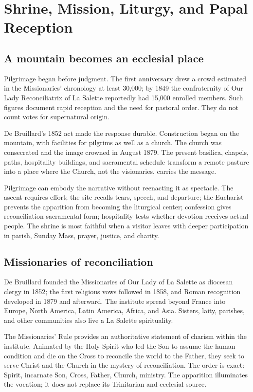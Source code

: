 \section{Shrine, Mission, Liturgy, and Papal Reception}

\subsection{A mountain becomes an ecclesial place}

Pilgrimage began before judgment. The first anniversary drew a crowd estimated in the Missionaries' chronology at least 30,000; by 1849 the confraternity of Our Lady Reconciliatrix of La Salette reportedly had 15,000 enrolled members. Such figures document rapid reception and the need for pastoral order. They do not count votes for supernatural origin.

De Bruillard's 1852 act made the response durable. Construction began on the mountain, with facilities for pilgrims as well as a church. The church was consecrated and the image crowned in August 1879. The present basilica, chapels, paths, hospitality buildings, and sacramental schedule transform a remote pasture into a place where the Church, not the visionaries, carries the message.

Pilgrimage can embody the narrative without reenacting it as spectacle. The ascent requires effort; the site recalls tears, speech, and departure; the Eucharist prevents the apparition from becoming the liturgical center; confession gives reconciliation sacramental form; hospitality tests whether devotion receives actual people. The shrine is most faithful when a visitor leaves with deeper participation in parish, Sunday Mass, prayer, justice, and charity.

\subsection{Missionaries of reconciliation}

De Bruillard founded the Missionaries of Our Lady of La Salette as diocesan clergy in 1852; the first religious vows followed in 1858, and Roman recognition developed in 1879 and afterward. The institute spread beyond France into Europe, North America, Latin America, Africa, and Asia. Sisters, laity, parishes, and other communities also live a La Salette spirituality.

The Missionaries' Rule provides an authoritative statement of charism within the institute. Animated by the Holy Spirit who led the Son to assume the human condition and die on the Cross to reconcile the world to the Father, they seek to serve Christ and the Church in the mystery of reconciliation. The order is exact: Spirit, incarnate Son, Cross, Father, Church, ministry. The apparition illuminates the vocation; it does not replace its Trinitarian and ecclesial source.

